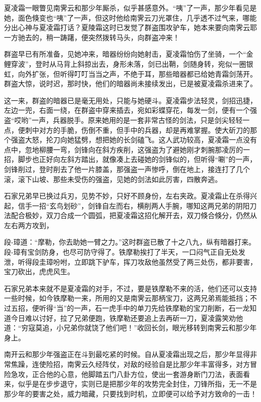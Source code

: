 \documentclass[12pt,oneside]{book}
\begin{document}
夏凌霜一眼瞥见南霁云和那少年厮杀，似乎甚感意外。``咦''了一声，那少年看见是她，面色倏变也``咦''了一声，但这时他给南霁云刀光罩住，几乎透不过气来，哪能分出心神与夏凌霜打话？夏陵霜这时已发觉了群盗围攻驴车，她本来要向南霁云耶一方驰去的，稍一踌躇，便突然拨转马头，向群盗冲来！

群盗早已有所准备，见她冲来，暗器纷纷向她射击，夏凌霜怕伤了坐骑，一个``金鲤穿波''，登时从马背上斜掠出去，身形未落，剑已出鞘，剑随身转，宛似一圈银虹，向外扩张，但听得叮叮当当之声，不绝于耳，那些暗器都已给她青霜剑荡开。群盗大惊，说时迟，那时快，他们的暗器尚未接续发出，已是被夏凌霜杀进来了。

这一来，群盗的暗器已是毫无用处，只能与她硬斗。夏凌霜步法轻灵，剑招迅捷，左边一兜，右面一绕，在群盗中穿来插去，宛如彩蝶穿花，每发一剑，便有一个强盗``哎哟''一声，兵器脱手。原来她用的是一套非常古怪的剑法，只是剑尖轻轻一点，便刺中对方的手脆，伤倒不重，但手中的兵器，却是再难掌握。使大斫刀的那个强盗大怒，抡刀向她猛劈，想把她的长剑磕飞。这人武功较高，夏凌霜一点没有点中，忽地柳腰一弯，剑锋向在斜方疾削，这强盗为了避她刚才刺腕那凌厉的一招，脚步也正好向左斜方踏出，就像凑上去碰她的剑锋似的，但听得``唰''的一声，剑锋削过，登时削去了他一片膝盖，那强盗一声惨呼，倒在地上，接连打了几个滚，滚下山坡、那些未受伤的强盗，见她的剑法如此厉害，四散奔逃。

石家兄弟早已换过兵刃，见势不妙，只好不顾身份，左右夹政。夏凌霜止在杀得兴起，信手一招``玄鸟划砂''，剑锋自左而右，横削两人手腕，哪知这两兄弟的阴阳刀法配合极妙，双刀合成一个圆弧，把夏凌霜这招化解开去，双刀倏合倏分，仍然从左右两方攻到，

段-璋道：``摩勒，你去助她一臂之力。''这时群盗已散了十之八九，纵有暗器打来。段-璋有宝剑防身，也尽可防守得了。铁摩勒挨打了半天，一口闷气正自无处发泄，听得段圭璋吩咐，立即跳下驴车，挥刀攻敌他虽然受了两三处伤，都非要害，宝刀砍出，虎虎风生。

石家兄弟本来就不是夏凌霜的对手，不过，要是铁摩勒不来的活，他们还可以支持一些时候，如今铁摩勒一来，所用的又是南霁云那柄宝刀，这两兄弟焉能抵挡；不过五招，便听得``当''的一声，石一虎手中的单刀先给铁摩勒的宝刀削断，石一龙知道今日难以讨好，拉了兄弟便跑，铁摩勒还要追上去再斫一刀，夏凌露笑劝他道：``穷寇莫追，小兄弟你就饶了他们吧！''收回长剑，眼光移转到南霁云和那少年身上。

南开云和那少年强盗正在斗到最吃紧的时候。自从夏凌霜出现之后，那少年显得非常焦躁，连使险招，南霁云久经阵仗，对敌的经验自是比那少年丰富得多，对方冒险急攻，正合他的心意，他脚踏五门八卦方位，使出一套游身断门刀法，表面看来，似乎是在步步退守，实则已是把那少年的攻势完全封住，刀锋所指，无一不是那少年的要害之处，威力暗藏，只要找到时机，立即便可以给予对方致命的一击！
\end{document}
